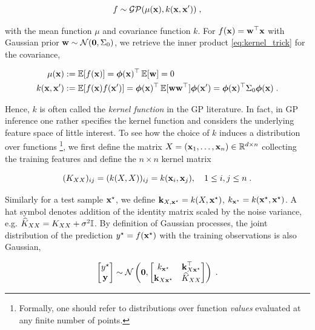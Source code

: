 \documentclass{article}
\begin{document}
\begin{equation*}
    f \sim \mathcal{GP}(\mu(\boldsymbol{\mathbf{x}}), k(\boldsymbol{\mathbf{x}}, \boldsymbol{\mathbf{x}}')) \;,
\end{equation*}

with the mean function $\mu$ and covariance function $k$. For $f(\boldsymbol{\mathbf{x}}) = \boldsymbol{\mathbf{w}}^\top \boldsymbol{\mathbf{x}}$ with Gaussian prior $\boldsymbol{\mathbf{w}} \sim \mathcal N(\boldsymbol{\mathbf{0}}, \Sigma_0)$, we retrieve the inner product \eqref{eq:kernel_trick} for the covariance,

\begin{align*}
    \mu(\boldsymbol{\mathbf{x}}) &:= \operatorname{\mathbb{E}} [f(\boldsymbol{\mathbf{x}})] = \boldsymbol{\mathbf{\phi}}(\boldsymbol{\mathbf{x}})^\top \operatorname{\mathbb{E}}[\boldsymbol{\mathbf{w}}] = 0\\
    k(\boldsymbol{\mathbf{x}}, \boldsymbol{\mathbf{x}}') &:= \operatorname{\mathbb{E}}[f(\boldsymbol{\mathbf{x}})f(\boldsymbol{\mathbf{x}}')] = \boldsymbol{\mathbf{\phi}}(\boldsymbol{\mathbf{x}})^\top \operatorname{\mathbb{E}}[\boldsymbol{\mathbf{w}} \boldsymbol{\mathbf{w}}^\top] \boldsymbol{\mathbf{\phi}}(\boldsymbol{\mathbf{x}}') = \boldsymbol{\mathbf{\phi}}(\boldsymbol{\mathbf{x}})^\top \Sigma_0 \boldsymbol{\mathbf{\phi}}(\boldsymbol{\mathbf{x}}) \;.
\end{align*}

Hence, $k$ is often called the \emph{kernel function} in the GP literature.
In fact, in GP inference one rather specifies the kernel function and considers the underlying feature space of little interest. To see how the choice of $k$ induces a distribution over functions
\footnote{Formally, one should refer to distributions over function \emph{values} evaluated at any finite number of points.}, 
we first define the matrix $X = (\boldsymbol{\mathbf{x}}_1, \ldots, \boldsymbol{\mathbf{x}}_n) \in \mathbb R^{d \times n}$ collecting the training features and define the $n\times n$ kernel matrix

\begin{equation*}
    (K_{XX})_{ij} = (k(X, X))_{ij} = k(\boldsymbol{\mathbf{x}}_i, \boldsymbol{\mathbf{x}}_j), \quad 1 \le i, j \le n \; .
\end{equation*}

Similarly for a test sample $\boldsymbol{\mathbf{x}}^\star$, we define $\boldsymbol{\mathbf{k}}_{X, \boldsymbol{\mathbf{x}} ^\star} = k(X, \boldsymbol{\mathbf{x}}^\star)$, $k_{\boldsymbol{\mathbf{x}} ^\star} = k(\boldsymbol{\mathbf{x}} ^\star, \boldsymbol{\mathbf{x}} ^\star)$. A hat symbol denotes addition of the identity matrix scaled by the noise variance, e.g. $\widehat K_{XX} = K_{XX} + \sigma^2 \Id$. By definition of Gaussian processes, the joint distribution of the prediction $y^\star = f(\boldsymbol{\mathbf{x}}^\star)$ with the training observations is also Gaussian,

\begin{equation*}
    \begin{bmatrix} y^\star \\ \boldsymbol{\mathbf{y}} \end{bmatrix}
    \sim \mathcal N \left( \boldsymbol{\mathbf{0}}, \begin{bmatrix}
        k_{\boldsymbol{\mathbf{x}}^\star} & \boldsymbol{\mathbf{k}}_{X \boldsymbol{\mathbf{x}}^\star}^\top \\
        \boldsymbol{\mathbf{k}}_{X \boldsymbol{\mathbf{x}}^\star} & \widehat K_{XX}
    \end{bmatrix} \right) \; .
\end{equation*}
\end{document}
